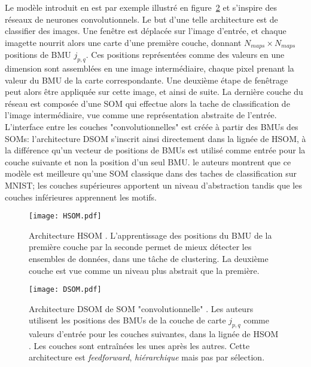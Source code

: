 \documentclass[../main]{subfiles}
\begin{document}
Le modèle introduit en \cite{Liu2015DeepSM} est par exemple illustré en figure~\ref{fig:dsom} et s'inspire des réseaux de neurones convolutionnels.
Le but d'une telle architecture est de classifier des images. Une fenêtre est déplacée sur l'image d'entrée, et chaque imagette nourrit alors une carte d'une première couche, donnant $N_{maps}  \times N_{maps}$ positions de BMU $j_{p,q}$. Ces positions représentées comme des valeurs en une dimension sont assemblées en une image intermédiaire, chaque pixel prenant la valeur du BMU de la carte correspondante. Une deuxième étape de fenêtrage peut alors être appliquée sur cette image, et ainsi de suite. La dernière couche du réseau est composée d'une SOM qui effectue alors la tache de classification de l'image intermédiaire, vue comme une représentation abstraite  de l'entrée.
L'interface entre les couches "convolutionnelles" est créée à partir des BMUs des SOMs: l'architecture DSOM s'inscrit ainsi directement dans la lignée de HSOM, à la différence qu'un vecteur de positions de BMUs est utilisé comme entrée pour la couche suivante et non la position d'un seul BMU.
le auteurs montrent que ce modèle est meilleure qu'une SOM classique dans des taches de classification sur MNIST; les couches supérieures apportent un niveau d'abstraction tandis que les couches inférieures apprennent les motifs.


\begin{figure}
    \centering
    \texttt{[image: HSOM.pdf]}
    \caption{Architecture HSOM \cite{lampinen_clustering_1992}. L'apprentissage des positions du BMU de la première couche par la seconde permet de mieux détecter les ensembles de données, dans une tâche de clustering. La deuxième couche est vue comme un niveau plus abstrait que la première. \label{fig:hsom}}
\end{figure}

\begin{figure}
    \texttt{[image: DSOM.pdf]}
    \caption{Architecture DSOM de SOM "convolutionnelle" \cite{liu_deep_2015}. Les auteurs utilisent les positions des BMUs de la couche de carte $j_{p,q}$ comme valeurs d'entrée pour les couches suivantes, dans la lignée de HSOM \cite{lampinen_clustering_1992}. Les couches sont entraînées les unes après les autres. Cette architecture est \emph{feedforward}, \emph{hiérarchique} mais pas par sélection. \label{fig:dsom}}
\end{figure}
\end{document}
